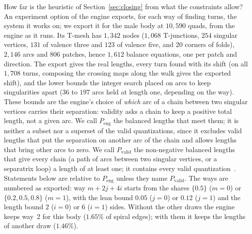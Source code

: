 \documentclass[11pt,a4paper]{article}
\begin{document}
How far is the heuristic of Section~\ref{sec:closing} from what the
constraints allow? An experiment option of the engine exports, for each way
of finding turns, the system it works on; we export it for the male body at
$10{,}590$ quads, from the engine as it runs. Its T-mesh has $1{,}342$ nodes
($1{,}068$ T-junctions, $254$ singular vertices, $131$ of valence three and
$123$ of valence five, and $20$ corners of folds), $2{,}146$ arcs and $806$
patches, hence $1{,}612$ balance equations, one per patch and direction. The
export gives the real lengths, every turn found with its shift (on all
$1{,}708$ turns, composing the crossing maps along the walk gives the
exported shift), and the lower bounds the integer search placed on arcs to
keep singularities apart ($36$ to $197$ arcs held at length one, depending on
the way). These bounds are the engine's choice of
\emph{which} arc of a chain between two singular vertices carries their
separation: validity asks a chain to keep a positive total length, not a
given arc. We call
$P_{\mathrm{eng}}$ the balanced lengths that meet them; it is neither a
subset nor a superset of the valid quantizations, since it excludes valid
lengths that put the separation on another arc of the chain and allows
lengths that bring other arcs to zero. We call $P_{\mathrm{valid}}$ the
non-negative balanced lengths that give every chain (a path of arcs between
two singular vertices, or a separatrix loop) a length of at least one; it
contains every valid quantization~\cite{gardent2026turns}. Statements below
are relative to $P_{\mathrm{eng}}$ unless they name $P_{\mathrm{valid}}$. The ways are numbered as exported:
way $m + 2j + 4i$ starts from the shares $\{0.5\}$ ($m = 0$) or $\{0.2, 0.5,
0.8\}$ ($m = 1$), with the lean bound $0.05$ ($j = 0$) or $0.12$ ($j = 1$)
and the length bound $2$ ($i = 0$) or $6$ ($i = 1$) sides. Without the
other draws the engine keeps way~2 for this body ($1.65\%$ of spiral edges);
with them it keeps the lengths of another draw ($1.46\%$).
\end{document}
